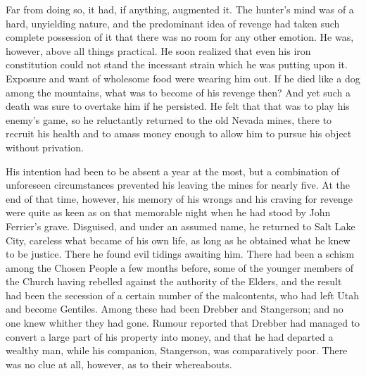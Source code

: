 \documentclass[12pt,english,oneside]{book}
\begin{document}
Far from doing so, it had, if anything, augmented it. The hunter's
mind was of a hard, unyielding nature, and the predominant idea of
revenge had taken such complete possession of it that there was no
room for any other emotion. He was, however, above all things practical.
He soon realized that even his iron constitution could not stand the
incessant strain which he was putting upon it. Exposure and want of
wholesome food were wearing him out. If he died like a dog among the
mountains, what was to become of his revenge then? And yet such a
death was sure to overtake him if he persisted. He felt that that
was to play his enemy's game, so he reluctantly returned to the old
Nevada mines, there to recruit his health and to amass money enough
to allow him to pursue his object without privation.

His intention had been to be absent a year at the most, but a combination
of unforeseen circumstances prevented his leaving the mines for nearly
five. At the end of that time, however, his memory of his wrongs and
his craving for revenge were quite as keen as on that memorable night
when he had stood by John Ferrier's grave. Disguised, and under an
assumed name, he returned to Salt Lake City, careless what became
of his own life, as long as he obtained what he knew to be justice.
There he found evil tidings awaiting him. There had been a schism
among the Chosen People a few months before, some of the younger members
of the Church having rebelled against the authority of the Elders,
and the result had been the secession of a certain number of the malcontents,
who had left Utah and become Gentiles. Among these had been Drebber
and Stangerson; and no one knew whither they had gone. Rumour reported
that Drebber had managed to convert a large part of his property into
money, and that he had departed a wealthy man, while his companion,
Stangerson, was comparatively poor. There was no clue at all, however,
as to their whereabouts.
\end{document}
